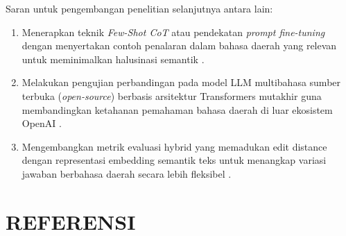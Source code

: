 \documentclass[10pt,a4paper]{article}
\begin{document}
Saran untuk pengembangan penelitian selanjutnya antara lain:
\begin{enumerate}\setlength{\itemsep}{0pt}\setlength{\parskip}{0pt}
    \item Menerapkan teknik \textit{Few-Shot CoT} atau pendekatan \textit{prompt fine-tuning} dengan menyertakan contoh penalaran dalam bahasa daerah yang relevan untuk meminimalkan halusinasi semantik \cite{kim2023cot, ji2024chain}.
    \item Melakukan pengujian perbandingan pada model LLM multibahasa sumber terbuka (\textit{open-source}) berbasis arsitektur Transformers mutakhir guna membandingkan ketahanan pemahaman bahasa daerah di luar ekosistem OpenAI \cite{wolf2020transformers}.
    \item Mengembangkan metrik evaluasi hybrid yang memadukan edit distance dengan representasi embedding semantik teks untuk menangkap variasi jawaban berbahasa daerah secara lebih fleksibel \cite{mugaanyi2024evaluation, li2024multiple}.
\end{enumerate}

\section*{REFERENSI}
\end{document}
